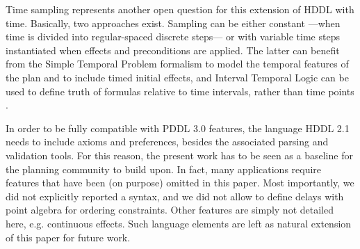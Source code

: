 \documentclass[letterpaper]{article} %
\begin{document}
Time sampling represents another open question for this extension of HDDL with time.
Basically, two approaches exist. Sampling can be either constant ---when time is divided into regular-spaced discrete steps--- or with variable time steps instantiated when effects and preconditions are applied. The latter can benefit from the Simple Temporal Problem formalism to model the temporal features of the plan and to include timed initial effects, and Interval Temporal Logic can be used to define truth of formulas relative to time intervals, rather than time points \citep{BRESOLIN2014269}.



In order to be fully compatible with PDDL 3.0 features, the language HDDL 2.1 needs to include axioms and preferences, besides the associated parsing and validation tools. For this reason, the present work has to be seen as a baseline for the planning community to build upon.
In fact, many applications require features that have been (on purpose) omitted in this paper. Most importantly, we did not explicitly reported a syntax, and we did not allow to define delays  with point algebra for ordering constraints. Other features are simply not detailed here, e.g. continuous effects.
Such language elements are left as natural extension of this paper for future work.

\newpage



\end{document}
